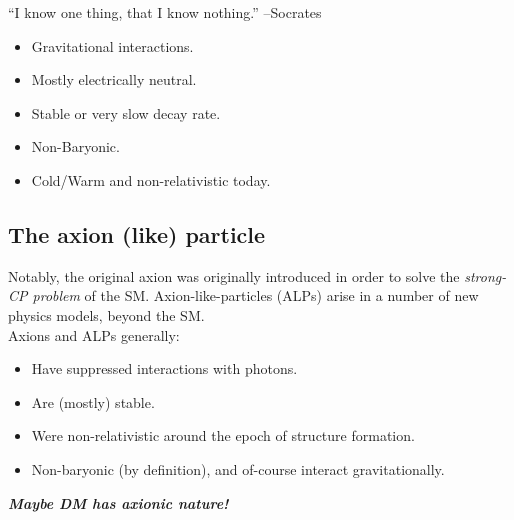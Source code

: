 \documentclass[10pt,utf8,compress,xcolor=dvipsnames]{beamer}
\begin{document}
\begin{frame}{\insertsubsectionhead}
	\begin{center}
		``I know one thing,  that I know nothing.''
		\flushright --Socrates %
	\end{center}
	
	\begin{itemize}
		\item Gravitational interactions.
		\item Mostly electrically neutral.
		\item Stable or very slow decay rate. 
		\item Non-Baryonic.
		\item Cold/Warm and non-relativistic today.
	\end{itemize}
	
\end{frame}

\subsection{The axion (like) particle}
\begin{frame}{\insertsubsectionhead}
	Notably, the original axion was originally introduced in order to solve the {\em strong-CP problem} of the SM.
	Axion-like-particles (ALPs) arise in a number of new physics models, beyond the SM.  \\[0.5cm]
	
	Axions and ALPs generally:
	\begin{itemize}
		\item Have suppressed interactions with photons.
		\item Are (mostly) stable. 
		\item Were non-relativistic around the epoch of structure formation. 
		\item Non-baryonic (by definition), and of-course interact gravitationally.\pause\\[1cm]
	\end{itemize}
	
	\begin{center}
		{\bf \em Maybe DM has axionic nature!}	
	\end{center}
	
\end{frame}
\end{document}
